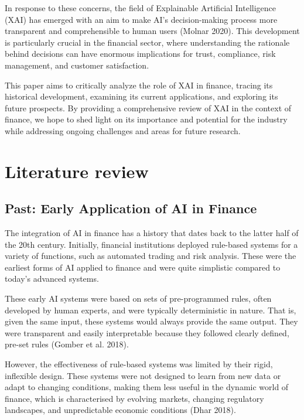 \documentclass[
  letterpaper,
  DIV=11,
  numbers=noendperiod]{scrartcl}
\begin{document}
In response to these concerns, the field of Explainable Artificial
Intelligence (XAI) has emerged with an aim to make AI's decision-making
process more transparent and comprehensible to human users (Molnar
2020). This development is particularly crucial in the financial sector,
where understanding the rationale behind decisions can have enormous
implications for trust, compliance, risk management, and customer
satisfaction.

This paper aims to critically analyze the role of XAI in finance,
tracing its historical development, examining its current applications,
and exploring its future prospects. By providing a comprehensive review
of XAI in the context of finance, we hope to shed light on its
importance and potential for the industry while addressing ongoing
challenges and areas for future research.

\hypertarget{literature-review}{%
\section{Literature review}\label{literature-review}}

\hypertarget{past-early-application-of-ai-in-finance}{%
\subsection{Past: Early Application of AI in
Finance}\label{past-early-application-of-ai-in-finance}}

The integration of AI in finance has a history that dates back to the
latter half of the 20th century. Initially, financial institutions
deployed rule-based systems for a variety of functions, such as
automated trading and risk analysis. These were the earliest forms of AI
applied to finance and were quite simplistic compared to today's
advanced systems.

These early AI systems were based on sets of pre-programmed rules, often
developed by human experts, and were typically deterministic in nature.
That is, given the same input, these systems would always provide the
same output. They were transparent and easily interpretable because they
followed clearly defined, pre-set rules (Gomber et al. 2018).

However, the effectiveness of rule-based systems was limited by their
rigid, inflexible design. These systems were not designed to learn from
new data or adapt to changing conditions, making them less useful in the
dynamic world of finance, which is characterised by evolving markets,
changing regulatory landscapes, and unpredictable economic conditions
(Dhar 2018).
\end{document}
